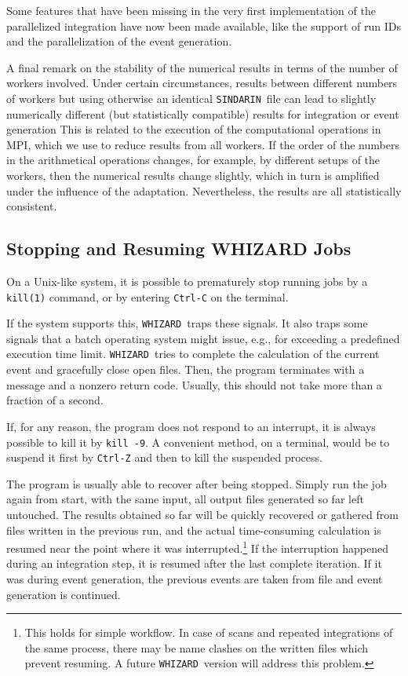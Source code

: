 \documentclass[12pt]{book}
\newcommand{\ttt}[1]{\texttt{#1}}
\newcommand{\whizard}{\ttt{WHIZARD}}
\newcommand{\sindarin}{\ttt{SINDARIN}}
\begin{document}
Some features that have been missing in the very first implementation
of the parallelized integration have now been made available, like
the support of run IDs and the parallelization of the event generation.

A final remark on the stability of the numerical results in terms of
the number of workers involved. Under certain circumstances, results
between different numbers of workers but using otherwise an identical
\sindarin\ file can lead to slightly numerically different (but
statistically compatible) results for integration or event generation
This is related to the execution of the computational operations in
MPI, which we use to reduce results from all workers. If the order of
the numbers in the arithmetical operations changes, for example, by
different setups of the workers, then the numerical results change
slightly, which in turn is amplified under the influence of the
adaptation. Nevertheless, the results are all statistically
consistent.

\subsection{Stopping and Resuming WHIZARD Jobs}

On a Unix-like system, it is possible to prematurely stop running jobs
by a \ttt{kill(1)} command, or by entering \ttt{Ctrl-C} on the
terminal.

If the system supports this, \whizard\ traps these signals.  It also
traps some signals that a batch operating system might issue, e.g.,
for exceeding a predefined execution time limit.  \whizard\ tries to
complete the calculation of the current event and gracefully close
open files.  Then, the program terminates with a message and a nonzero
return code.  Usually, this should not take more than a fraction of a
second.

If, for any reason, the program does not respond to an interrupt, it
is always possible to kill it by \ttt{kill -9}.  A convenient method,
on a terminal, would be to suspend it first by \ttt{Ctrl-Z} and then
to kill the suspended process.

The program is usually able to recover after being stopped.  Simply
run the job again from start, with the same input, all output files
generated so far left untouched.  The results obtained so far will be
quickly recovered or gathered from files written in the previous run,
and the actual time-consuming calculation is resumed near the point
where it was interrupted.\footnote{This holds for simple workflow.  In
  case of scans and repeated integrations of the same process, there
  may be name clashes on the written files which prevent resuming.  A
  future \whizard\ version will address this problem.}  If the
interruption happened during an integration step, it is resumed after
the last complete iteration.  If it was during event generation, the
previous events are taken from file and event generation is continued.
\end{document}
